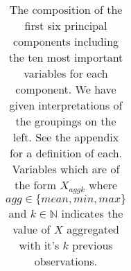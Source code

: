 \begin{table}[!htbp]
\begin{tabular}{p{18mm}|p{58mm}}
\hline
\end{tabular} 
    \caption{The composition of the first six principal components including the ten most important variables for each component. We have given interpretations of the groupings on the left. See the appendix for a definition of each. Variables which are of the form $X_{agg k}$ where $agg \in \{mean, min, max\}$ and $k \in \mathbb{N}$ indicates the value of $X$ aggregated with it's $k$ previous observations.}
  \label{tab:pca_components} 
\end{table} 
